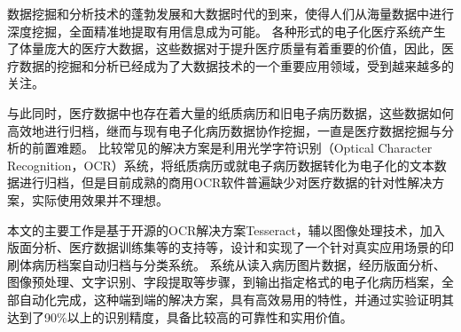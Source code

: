 ﻿\begin{cnabstract}
数据挖掘和分析技术的蓬勃发展和大数据时代的到来，使得人们从海量数据中进行深度挖掘，全面精准地提取有用信息成为可能。
各种形式的电子化医疗系统产生了体量庞大的医疗大数据，这些数据对于提升医疗质量有着重要的价值，因此，医疗数据的挖掘和分析已经成为了大数据技术的一个重要应用领域，受到越来越多的关注。

与此同时，医疗数据中也存在着大量的纸质病历和旧电子病历数据，这些数据如何高效地进行归档，继而与现有电子化病历数据协作挖掘，一直是医疗数据挖掘与分析的前置难题。
比较常见的解决方案是利用光学字符识别（Optical Character Recognition，OCR）系统，将纸质病历或就电子病历数据转化为电子化的文本数据进行归档，但是目前成熟的商用OCR软件普遍缺少对医疗数据的针对性解决方案，实际使用效果并不理想。

本文的主要工作是基于开源的OCR解决方案Tesseract，辅以图像处理技术，加入版面分析、医疗数据训练集等的支持等，设计和实现了一个针对真实应用场景的印刷体病历档案自动归档与分类系统。
系统从读入病历图片数据，经历版面分析、图像预处理、文字识别、字段提取等步骤，到输出指定格式的电子化病历档案，全部自动化完成，这种端到端的解决方案，具有高效易用的特性，并通过实验证明其达到了90\%以上的识别精度，具备比较高的可靠性和实用价值。

\end{cnabstract}

